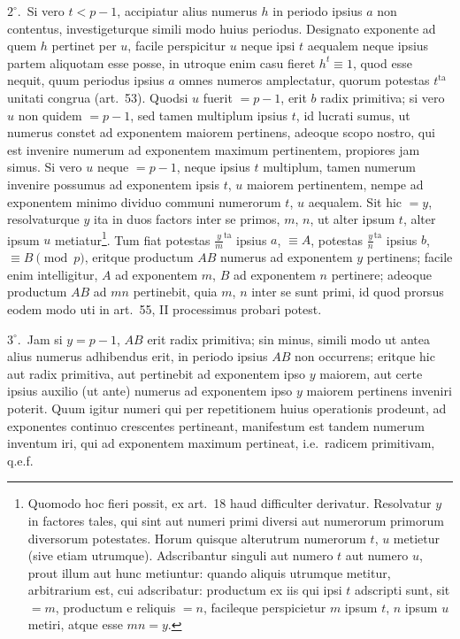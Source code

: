 \documentclass[12pt,a4paper]{article}
\theoremstyle{plain}
\theoremstyle{definition}
\theoremstyle{remark}
\begin{document}
$2^\circ$.\ Si vero $t < p-1$, accipiatur alius numerus $h$ in periodo ipsius $a$ non contentus, investigeturque simili modo huius periodus. Designato exponente ad quem $h$ pertinet per $u$, facile perspicitur $u$ neque ipsi $t$ aequalem neque ipsius partem aliquotam esse posse, in utroque enim casu fieret $h^t \equiv 1$, quod esse nequit, quum periodus ipsius $a$ omnes numeros amplectatur, quorum potestas $t^\text{ta}$ unitati congrua (art.~53). Quodsi $u$ fuerit $= p-1$, erit $b$ radix primitiva; si vero $u$ non quidem $= p-1$, sed tamen multiplum ipsius $t$, id lucrati sumus, ut numerus constet ad exponentem maiorem pertinens, adeoque scopo nostro, qui est invenire numerum ad exponentem maximum pertinentem, propiores jam simus. Si vero $u$ neque $= p-1$, neque ipsius $t$ multiplum, tamen numerum invenire possumus ad exponentem ipsis $t$, $u$ maiorem pertinentem, nempe ad exponentem minimo dividuo communi numerorum $t$, $u$ aequalem. Sit hic $= y$, resolvaturque $y$ ita in duos factors inter se primos, $m$, $n$, ut alter ipsum $t$, alter ipsum $u$ metiatur\footnote{Quomodo hoc fieri possit, ex art.~18 haud difficulter derivatur. Resolvatur $y$ in factores tales, qui sint aut numeri primi diversi aut numerorum primorum diversorum potestates. Horum quisque alterutrum numerorum $t$, $u$ metietur (sive etiam utrumque). Adscribantur singuli aut numero $t$ aut numero $u$, prout illum aut hunc metiuntur: quando aliquis utrumque metitur, arbitrarium est, cui adscribatur: productum ex iis qui ipsi $t$ adscripti sunt, sit $= m$, productum e reliquis $= n$, facileque perspicietur $m$ ipsum $t$, $n$ ipsum $u$ metiri, atque esse $mn = y$.}. Tum fiat potestas $\frac{y}{m}^\text{ta}$ ipsius $a$, $\equiv A$, potestas $\frac{y}{n}^\text{ta}$ ipsius $b$, $\equiv B \pmod{p}$, eritque productum $AB$ numerus ad exponentem $y$ pertinens; facile enim intelligitur, $A$ ad exponentem $m$, $B$ ad exponentem $n$ pertinere; adeoque productum $AB$ ad $mn$ pertinebit, quia $m$, $n$ inter se sunt primi, id quod prorsus eodem modo uti in art.~55, II processimus probari potest.

$3^\circ$.\ Jam si $y = p-1$, $AB$ erit radix primitiva; sin minus, simili modo ut antea alius numerus adhibendus erit, in periodo ipsius $AB$ non occurrens; eritque hic aut radix primitiva, aut pertinebit ad exponentem ipso $y$ maiorem, aut certe ipsius auxilio (ut ante) numerus ad exponentem ipso $y$ maiorem pertinens inveniri poterit. Quum igitur numeri qui per repetitionem huius operationis prodeunt, ad exponentes continuo crescentes pertineant, manifestum est tandem numerum inventum iri, qui ad exponentem maximum pertineat, i.e.\ radicem primitivam, q.e.f.
\end{document}
